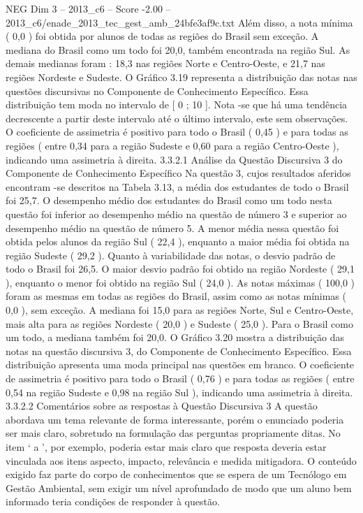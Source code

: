 \begin{textsample}{NEG Dim 3 – 2013\_c6 – Score -2.00 – 2013\_c6/enade\_2013\_tec\_gest\_amb\_24bfe3af9c.txt}
Além disso, a nota mínima ( 0,0 ) foi obtida por alunos de todas as regiões do Brasil sem exceção.
A mediana do Brasil como um todo foi 20,0, também encontrada na região Sul.
As demais medianas foram : 18,3 nas regiões Norte e Centro-Oeste, e 21,7 nas regiões Nordeste e Sudeste.
O Gráfico 3.19 representa a distribuição das notas nas questões discursivas no Componente de Conhecimento Específico.
Essa distribuição tem moda no intervalo de [ 0 ; 10 ].
Nota -se que há uma tendência decrescente a partir deste intervalo até o último intervalo, este sem observações.
O coeficiente de assimetria é positivo para todo o Brasil ( 0,45 ) e para todas as regiões ( entre 0,34 para a região Sudeste e 0,60 para a região Centro-Oeste ), indicando uma assimetria à direita. 3.3.2.1 Análise da Questão Discursiva 3 do Componente de Conhecimento Específico Na questão 3, cujos resultados aferidos encontram -se descritos na Tabela 3.13, a média dos estudantes de todo o Brasil foi 25,7.
O desempenho médio dos estudantes do Brasil como um todo nesta questão foi inferior ao desempenho médio na questão de número 3 e superior ao desempenho médio na questão de número 5.
A menor média nessa questão foi obtida pelos alunos da região Sul ( 22,4 ), enquanto a maior média foi obtida na região Sudeste ( 29,2 ).
Quanto à variabilidade das notas, o desvio padrão de todo o Brasil foi 26,5.
O maior desvio padrão foi obtido na região Nordeste ( 29,1 ), enquanto o menor foi obtido na região Sul ( 24,0 ).
As notas máximas ( 100,0 ) foram as mesmas em todas as regiões do Brasil, assim como as notas mínimas ( 0,0 ), sem exceção.
A mediana foi 15,0 para as regiões Norte, Sul e Centro-Oeste, mais alta para as regiões Nordeste ( 20,0 ) e Sudeste ( 25,0 ).
Para o Brasil como um todo, a mediana também foi 20,0.
O Gráfico 3.20 mostra a distribuição das notas na questão discursiva 3, do Componente de Conhecimento Específico.
Essa distribuição apresenta uma moda principal nas questões em branco.
O coeficiente de assimetria é positivo para todo o Brasil ( 0,76 ) e para todas as regiões ( entre 0,54 na região Sudeste e 0,98 na região Sul ), indicando uma assimetria à direita. 3.3.2.2 Comentários sobre as respostas à Questão Discursiva 3 A questão abordava um tema relevante de forma interessante, porém o enunciado poderia ser mais claro, sobretudo na formulação das perguntas propriamente ditas.
No item ‘ a ’, por exemplo, poderia estar mais claro que resposta deveria estar vinculada aos itens aspecto, impacto, relevância e medida mitigadora.
O conteúdo exigido faz parte do corpo de conhecimentos que se espera de um Tecnólogo em Gestão Ambiental, sem exigir um nível aprofundado de modo que um aluno bem informado teria condições de responder à questão.

\end{textsample}
